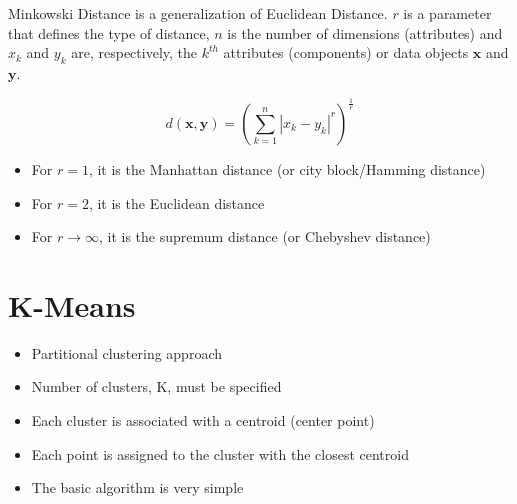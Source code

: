 Minkowski Distance is a generalization of Euclidean Distance. $r$ is a parameter that defines the type of distance, $n$ is the number of dimensions (attributes) and $x_k$ and $y_k$ are, respectively, the $k^{th}$ attributes (components) or data objects $\mathbf{x}$ and $\mathbf{y}$.

\[
d(\mathbf{x}, \mathbf{y}) = \left(\sum_{k=1}^{n} |x_k - y_k|^r\right)^{\frac{1}{r}}
\]

\begin{itemize}
	\item For $r=1$, it is the Manhattan distance (or city block/Hamming distance)
	\item For $r=2$, it is the Euclidean distance
	\item For $r \rightarrow \infty$, it is the supremum distance (or Chebyshev distance)
\end{itemize}


\section{K-Means}
\begin{itemize}
	\item Partitional clustering approach
	\item Number of clusters, K, must be specified
	\item Each cluster is associated with a centroid (center point)
	\item Each point is assigned to the cluster with the closest
centroid
	\item The basic algorithm is very simple
\end{itemize}